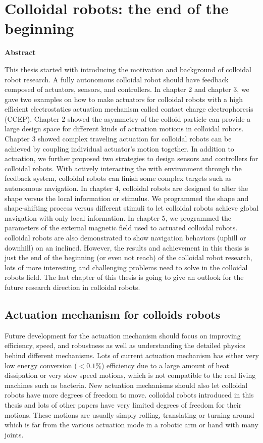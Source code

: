 \chapter{Colloidal robots: the end of the beginning }
\begin{center}
\vspace*{1\baselineskip}
\textbf{Abstract}
\end{center}
This thesis started with introducing the motivation and background of colloidal robot research. A fully autonomous colloidal robot should have feedback composed of actuators, sensors, and controllers.  In chapter 2 and chapter 3, we gave two examples on how to make actuators for colloidal robots with a high efficient electrostatics actuation mechanism called contact charge electrophoresis (CCEP). Chapter 2 showed the asymmetry of the colloid particle can provide a large design space for different kinds of actuation motions in colloidal robots.  Chapter 3 showed complex traveling actuation for colloidal robots can be achieved by coupling individual actuator's motion together.  In addition to actuation, we further proposed two strategies to design sensors and controllers for colloidal robots. With actively interacting the with environment through the feedback system, colloidal robots can finish some complex targets such as autonomous navigation. In chapter 4, colloidal robots are designed to alter the shape versus the local information or stimulus. We programmed the shape and shape-shifting process versus different stimuli to let colloidal robots achieve global navigation with only local information. In chapter 5, we programmed the parameters of the external magnetic field used to actuated colloidal robots. colloidal robots are also demonstrated to show navigation behaviors  (uphill or downhill) on an inclined. However, the results and achievement in this thesis is just the end of the beginning (or even not reach) of the colloidal robot research, lots of more interesting and challenging problems need to solve in the colloidal robots field. The last chapter of this thesis is going to give an outlook for the future research direction in colloidal robots.
\section{Actuation mechanism for  colloids robots}
Future development for  the actuation mechanism should focus on improving efficiency, speed, and robustness as well as understanding the detailed physics behind different mechanisms. Lots of current actuation mechanism has either very low energy conversion ($<0.1\%$) efficiency due to a large amount of heat dissipation or very slow speed motions, which is not compatible to the real living machines such as bacteria. New actuation mechanisms should also let colloidal robots have more degrees of freedom to move. colloidal robots introduced in this thesis and lots of other papers have very limited degrees of freedom for their motions. These motions are usually simply rolling, translating or turning around which is far from the various actuation mode in a robotic arm or hand with many joints. 

